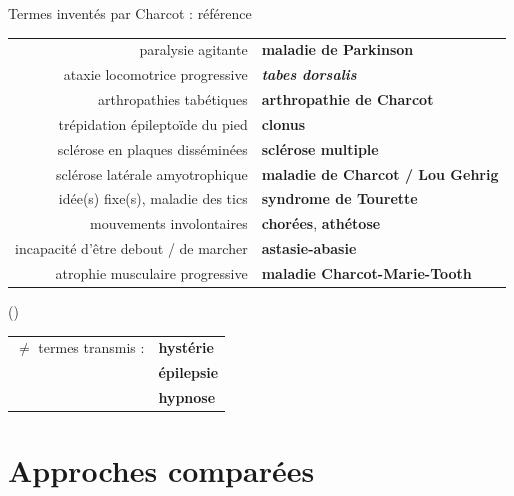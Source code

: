 \documentclass[xcolor={table,usenames,dvipsnames}]{beamer}
\newcommand{\bolder}[1]{{\color{purple}\bfseries#1}}
\begin{document}
\begin{frame}{Termes inventés par Charcot : référence}
	\begin{tabular}{rl}
		paralysie agitante & \bolder{maladie de Parkinson}\\
		ataxie locomotrice progressive & \bolder{\textit{tabes dorsalis}}\\
		arthropathies tabétiques & \bolder{arthropathie de Charcot}\\
		trépidation épileptoïde du pied  & \bolder{clonus}\\
		sclérose en plaques disséminées & \bolder{sclérose multiple}\\
		sclérose latérale amyotrophique & \bolder{maladie de Charcot / Lou Gehrig}\\
		idée(s) fixe(s), maladie des tics &  \bolder{syndrome de Tourette}\\
		mouvements involontaires  & 	\bolder{chorées}, \bolder{athétose}\\
		incapacité d'être debout / de marcher & \bolder{astasie-abasie}\\
		atrophie musculaire progressive & \bolder{maladie Charcot-Marie-Tooth}
	\end{tabular}
	\begin{flushright}
		\scriptsize
		(\citealp{walusinski,camargo2024})
	\end{flushright}
	\medskip
	\begin{flushright}
		\small
			\begin{tabular}{ll}
			$\neq$ termes transmis : & \textcolor{deepblue}{\textbf{hystérie}}\\ & \textcolor{deepblue}{\textbf{épilepsie}} \\ & \textcolor{deepblue}{\textbf{hypnose}}\\
		\end{tabular}

	\end{flushright}


\end{frame}

\section[Approches comparées]{Approches comparées}
\end{document}
